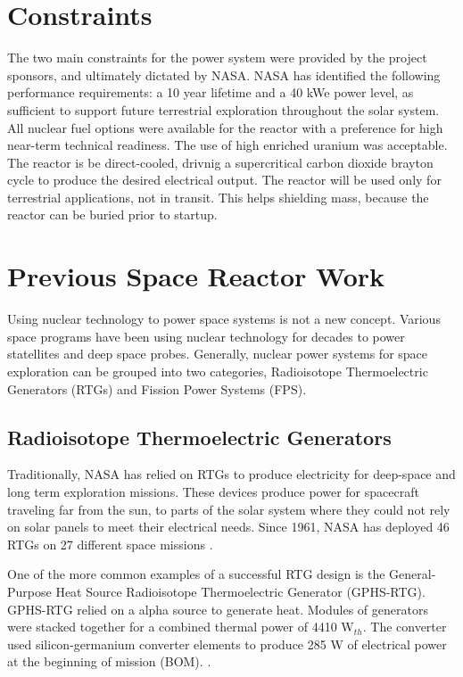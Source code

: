 \section{Constraints}
The two main constraints for the power system were provided by the project sponsors,
and ultimately dictated by NASA. NASA has identified the following performance
requirements: a 10 year lifetime and a 40 kWe power level, as sufficient to
support future terrestrial exploration throughout the solar system. All nuclear fuel
options were available for the reactor with a preference for high near-term
technical readiness. The use of high enriched uranium was acceptable. 
The reactor is be direct-cooled, drivnig a
supercritical carbon dioxide brayton cycle to produce the desired electrical
output. The reactor will be used only for terrestrial applications, not in
transit. This helps shielding mass, because the reactor can be buried prior to
startup.

\section{Previous Space Reactor Work}
Using nuclear technology to power space systems is not a new concept. Various
space programs have been using nuclear technology for decades to power
statellites and deep space probes. Generally, nuclear power systems for space
exploration can be grouped into two categories, Radioisotope Thermoelectric
Generators (RTGs) and Fission Power Systems (FPS). 

\subsection{Radioisotope Thermoelectric Generators}
Traditionally, NASA has relied on RTGs to
produce electricity for deep-space and long term exploration missions. These
devices produce power for spacecraft traveling far from the sun, to parts of the
solar system where they could not rely on solar panels to meet their electrical
needs. Since 1961, NASA has deployed 46 RTGs on 27 different space missions
\citep{mmrtg_fact}.

One of the more common examples of a successful RTG design is the
General-Purpose Heat Source Radioisotope Thermoelectric Generator (GPHS-RTG).
GPHS-RTG relied on a \pu alpha source to generate heat. Modules of \pu
generators were stacked together for a combined thermal power of 4410
W$_{th}$. The
converter used silicon-germanium converter elements to produce 285 W of
electrical power at the beginning of mission (BOM).
\citep{bennett_mission_2006}. 

